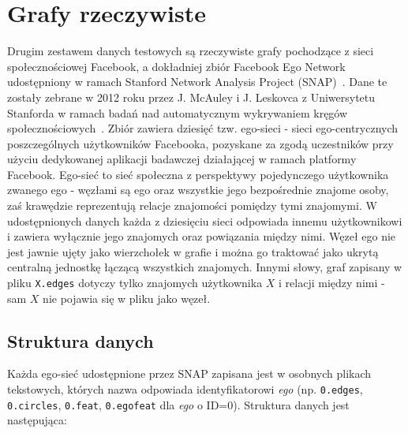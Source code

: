 

\section{Grafy rzeczywiste}
Drugim zestawem danych testowych są rzeczywiste grafy pochodzące z sieci społecznościowej Facebook,
a dokładniej zbiór Facebook Ego Network udostępniony w ramach Stanford Network Analysis Project (SNAP)~\cite{snapnets}.
Dane te zostały zebrane w 2012 roku przez J. McAuley i J. Leskovca z Uniwersytetu Stanforda w ramach badań nad automatycznym wykrywaniem kręgów społecznościowych~\cite{McAuley2012}. Zbiór zawiera dziesięć tzw. ego-sieci - sieci ego-centrycznych poszczególnych użytkowników Facebooka, pozyskane za zgodą uczestników przy użyciu dedykowanej aplikacji badawczej działającej w ramach platformy Facebook. Ego-sieć to sieć społeczna z perspektywy pojedynczego użytkownika zwanego ego - węzłami są ego oraz wszystkie jego bezpośrednie znajome osoby, zaś krawędzie reprezentują relacje znajomości pomiędzy tymi znajomymi. W udostępnionych danych każda z dziesięciu sieci odpowiada innemu użytkownikowi i zawiera wyłącznie jego znajomych oraz powiązania między nimi. Węzeł ego nie jest jawnie ujęty jako wierzchołek w grafie i można go traktować jako ukrytą centralną jednostkę łączącą wszystkich znajomych. Innymi słowy, graf zapisany w pliku \verb|X.edges| dotyczy tylko znajomych użytkownika $X$ i relacji między nimi - sam $X$ nie pojawia się w pliku jako węzeł.

\subsection{Struktura danych}

Każda ego-sieć udostępnione przez SNAP zapisana jest w osobnych plikach tekstowych, których nazwa odpowiada identyfikatorowi \textit{ego} (np. \verb|0.edges|, \verb|0.circles|, \verb|0.feat|, \verb|0.egofeat| dla \textit{ego} o ID=0). Struktura danych jest następująca:


